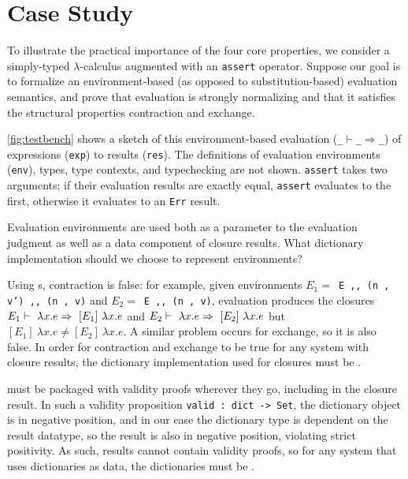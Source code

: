 \section{Case Study}
\label{sec:CaseStudy}



To illustrate the practical importance of the four core properties, we consider a simply-typed $\lambda$-calculus augmented with an \texttt{assert} operator.
%
Suppose our goal is to formalize an environment-based (as opposed to substitution-based) evaluation semantics,
%
and prove that evaluation is strongly normalizing and that it satisfies the structural properties contraction and exchange.

\autoref{fig:testbench} shows a sketch of this environment-based evaluation (\texttt{\_$\vdash$\_$\Rightarrow$\_}) of expressions (\texttt{exp}) to results (\texttt{res}).
%
The definitions of evaluation environments (\texttt{env}), types, type contexts, and typechecking are not shown.
%
%
\texttt{assert} takes two arguments; if their evaluation results are exactly equal, \texttt{assert} evaluates to the first,
otherwise it evaluates to an \texttt{Err} result.

Evaluation environments are used both as a parameter to the evaluation judgment as well as a data component of closure results.
%
What dictionary implementation should we choose to represent environments?

%

Using \sal{}s, contraction is false:
%
for example, given environments
%
$E_1=$\ \texttt{E ,, (n , v') ,, (n , v)} and
%
$E_2=$\ \texttt{E ,, (n , v)},
%
evaluation produces the closures
%
$E_1 \vdash~\lambda x. e \Rightarrow~[E_1]\ \lambda x. e$
%
and
%
$E_2 \vdash~\lambda x. e \Rightarrow~[E_2]\ \lambda x. e$
%
but
%
$[E_1]\ \lambda x. e \neq [E_2]\ \lambda x. e$.
%
A similar problem occurs for exchange, so it is also false.
%
In order for contraction and exchange to be true for any system with closure results,
the dictionary implementation used for closures must be \extensional.

\Cals{} must be packaged with validity proofs wherever they go, including in the closure result.
In such a validity proposition \texttt{valid : dict -> Set},
%
%
the dictionary object is in negative position,
and in our case the dictionary type is dependent on the result datatype,
so the result is also in negative position, violating strict positivity.
As such, results cannot contain validity proofs, so for any system that uses dictionaries as data,
the dictionaries must be \semanticallyTotal.

